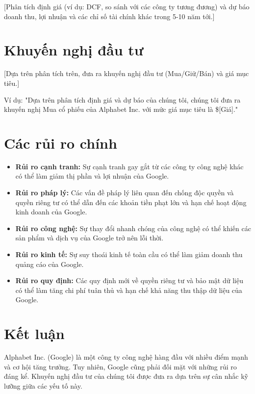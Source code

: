 \documentclass[12pt]{article}
\begin{document}
[Phân tích định giá (ví dụ: DCF, so sánh với các công ty tương đương) và dự báo doanh thu, lợi nhuận và các chỉ số tài chính khác trong 5-10 năm tới.]

\section{Khuyến nghị đầu tư}

[Dựa trên phân tích trên, đưa ra khuyến nghị đầu tư (Mua/Giữ/Bán) và giá mục tiêu.]

Ví dụ: "Dựa trên phân tích định giá và dự báo của chúng tôi, chúng tôi đưa ra khuyến nghị Mua cổ phiếu của Alphabet Inc. với mức giá mục tiêu là \$[Giá]."

\section{Các rủi ro chính}

\begin{itemize}
    \item \textbf{Rủi ro cạnh tranh:} Sự cạnh tranh gay gắt từ các công ty công nghệ khác có thể làm giảm thị phần và lợi nhuận của Google.
    \item \textbf{Rủi ro pháp lý:} Các vấn đề pháp lý liên quan đến chống độc quyền và quyền riêng tư có thể dẫn đến các khoản tiền phạt lớn và hạn chế hoạt động kinh doanh của Google.
    \item \textbf{Rủi ro công nghệ:} Sự thay đổi nhanh chóng của công nghệ có thể khiến các sản phẩm và dịch vụ của Google trở nên lỗi thời.
    \item \textbf{Rủi ro kinh tế:} Sự suy thoái kinh tế toàn cầu có thể làm giảm doanh thu quảng cáo của Google.
    \item \textbf{Rủi ro quy định:} Các quy định mới về quyền riêng tư và bảo mật dữ liệu có thể làm tăng chi phí tuân thủ và hạn chế khả năng thu thập dữ liệu của Google.
\end{itemize}

\section{Kết luận}

Alphabet Inc. (Google) là một công ty công nghệ hàng đầu với nhiều điểm mạnh và cơ hội tăng trưởng. Tuy nhiên, Google cũng phải đối mặt với những rủi ro đáng kể.  Khuyến nghị đầu tư của chúng tôi được đưa ra dựa trên sự cân nhắc kỹ lưỡng giữa các yếu tố này.
\end{document}
